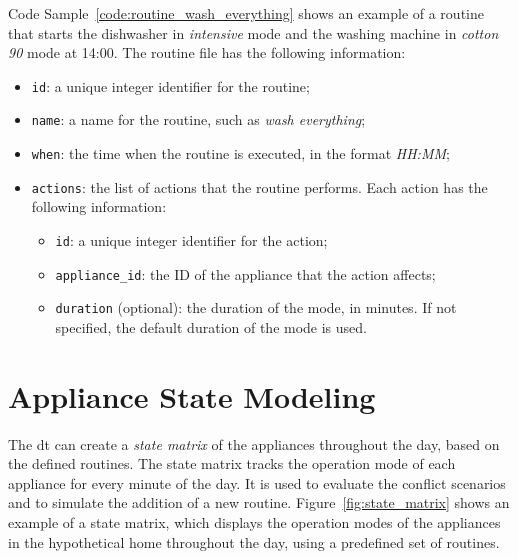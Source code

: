 Code Sample~\ref{code:routine_wash_everything} shows an example of a routine that starts the dishwasher in \textit{intensive} mode and the washing machine in \textit{cotton 90} mode at 14:00. The routine file has the following information:
\begin{itemize}
    \item \texttt{id}: a unique integer identifier for the routine;
    \item \texttt{name}: a name for the routine, such as \textit{wash everything};
    \item \texttt{when}: the time when the routine is executed, in the format \textit{HH:MM};
    \item \texttt{actions}: the list of actions that the routine performs. Each action has the following information:
    \begin{itemize}
        \item \texttt{id}: a unique integer identifier for the action;
        \item \texttt{appliance\_id}: the ID of the appliance that the action affects;
        \item \texttt{duration} (optional): the duration of the mode, in minutes. If not specified, the default duration of the mode is used.
    \end{itemize}
\end{itemize}



\section{Appliance State Modeling}

The \acrshort{dt} can create a \textit{state matrix} of the appliances throughout the day, based on the defined routines. The state matrix tracks the operation mode of each appliance for every minute of the day. It is used to evaluate the conflict scenarios and to simulate the addition of a new routine. Figure~\ref{fig:state_matrix} shows an example of a state matrix, which displays the operation modes of the appliances in the hypothetical home throughout the day, using a predefined set of routines.

